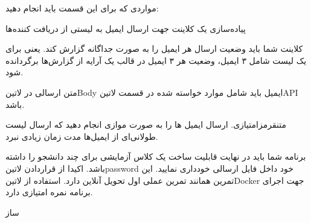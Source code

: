 \documentclass{../assignment}
\begin{document}
مواردی که برای این قسمت باید انجام دهید:

 پیاده‌سازی یک کلاینت جهت ارسال ایمیل به لیستی از دریافت کننده‌ها

 کلاینت شما باید وضعیت ارسال هر ایمیل را به صورت جداگانه گزارش کند.
یعنی برای یک لیست شامل ۳ ایمیل، وضعیت هر ۳ ایمیل در قالب یک آرایه از گزارش‌ها برگردانده شود.

 متن ارسالی در ‌لاتین{Body} ایمیل باید شامل موارد خواسته شده در قسمت ‌لاتین{API} باشد.

 ‌متن{قرمز}{امتیازی.} ارسال ایمیل ها را به صورت موازی انجام دهید که ارسال لیست طولانی‌ای از ایمیل‌ها مدت زمان زیادی نبرد.




 برنامه شما باید در نهایت قابلیت ساخت یک کلاس آزمایشی برای چند دانشجو را داشته باشد.
 اکیدا از قراردادن ‌لاتین{password} خود داخل فایل ارسالی خودداری نمایید.
 این تمرین همانند تمرین عملی اول تحویل آنلاین دارد.
 استفاده از ‌لاتین{Docker} جهت اجرای برنامه نمره امتیازی دارد.


‌ساز
\end{document}

